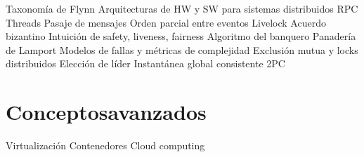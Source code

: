 Taxonomía de Flynn
Arquitecturas de HW y SW para sistemas distribuidos
RPC
Threads
Pasaje de mensajes
Orden parcial entre eventos
Livelock
Acuerdo bizantino
Intuición de safety, liveness, fairness
Algoritmo del banquero
Panadería de Lamport
Modelos de fallas y métricas de complejidad
Exclusión mutua y locks distribuidos
Elección de líder
Instantánea global consistente
2PC

\section{Conceptosavanzados}

Virtualización
Contenedores
Cloud computing



